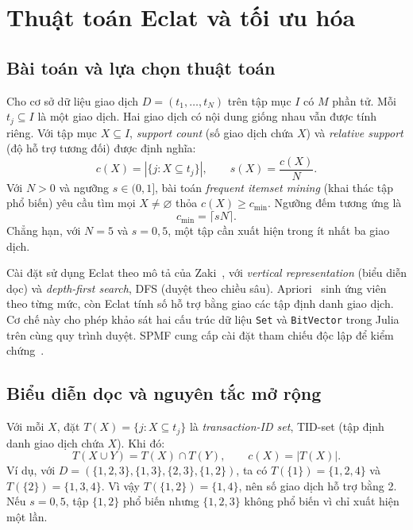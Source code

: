 \section{Thuật toán Eclat và tối ưu hóa}
\label{sec:tv1}

\subsection{Bài toán và lựa chọn thuật toán}
Cho cơ sở dữ liệu giao dịch $D=(t_1,\ldots,t_N)$ trên tập mục $I$ có $M$ phần tử. Mỗi $t_j\subseteq I$ là một giao dịch. Hai giao dịch có nội dung giống nhau vẫn được tính riêng. Với tập mục $X\subseteq I$, \emph{support count} (số giao dịch chứa $X$) và \emph{relative support} (độ hỗ trợ tương đối) được định nghĩa:
\begin{equation}
 c(X)=|\{j:X\subseteq t_j\}|,\qquad s(X)=\frac{c(X)}{N}.
 \label{eq:tv1-support}
\end{equation}
Với $N>0$ và ngưỡng $s\in(0,1]$, bài toán \emph{frequent itemset mining} (khai thác tập phổ biến) yêu cầu tìm mọi $X\ne\varnothing$ thỏa $c(X)\ge c_{\min}$. Ngưỡng đếm tương ứng là
\begin{equation}
 c_{\min}=\lceil sN\rceil.
 \label{eq:tv1-threshold}
\end{equation}
Chẳng hạn, với $N=5$ và $s=0{,}5$, một tập cần xuất hiện trong ít nhất ba giao dịch.

Cài đặt sử dụng Eclat theo mô tả của Zaki~\cite{zaki}, với \emph{vertical representation} (biểu diễn dọc) và \emph{depth-first search}, DFS (duyệt theo chiều sâu). Apriori~\cite{agrawal} sinh ứng viên theo từng mức, còn Eclat tính số hỗ trợ bằng giao các tập định danh giao dịch. Cơ chế này cho phép khảo sát hai cấu trúc dữ liệu \texttt{Set} và \texttt{BitVector} trong Julia~\cite{julia} trên cùng quy trình duyệt. SPMF cung cấp cài đặt tham chiếu độc lập để kiểm chứng~\cite{spmf}.

\subsection{Biểu diễn dọc và nguyên tắc mở rộng}
Với mỗi $X$, đặt $T(X)=\{j:X\subseteq t_j\}$ là \emph{transaction-ID set}, TID-set (tập định danh giao dịch chứa $X$). Khi đó:
\begin{equation}
 T(X\cup Y)=T(X)\cap T(Y),\qquad c(X)=|T(X)|.
 \label{eq:tv1-intersection}
\end{equation}
Ví dụ, với $D=(\{1,2,3\},\{1,3\},\{2,3\},\{1,2\})$, ta có $T(\{1\})=\{1,2,4\}$ và $T(\{2\})=\{1,3,4\}$. Vì vậy $T(\{1,2\})=\{1,4\}$, nên số giao dịch hỗ trợ bằng 2. Nếu $s=0{,}5$, tập $\{1,2\}$ phổ biến nhưng $\{1,2,3\}$ không phổ biến vì chỉ xuất hiện một lần.


